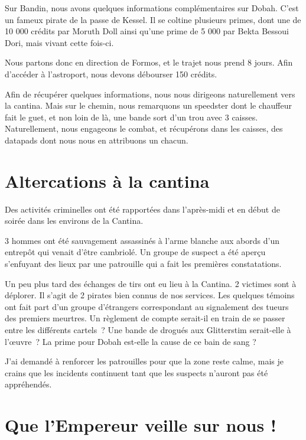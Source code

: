 \documentclass[a4paper,9pt,twoside,twocolumn,openany]{book}
\begin{document}
Sur Bandin, nous avons quelques informations complémentaires sur Dobah. C'est un fameux pirate de la passe de Kessel. Il se coltine plusieurs primes, dont une de 10 000 crédits par Moruth Doll ainsi qu'une prime de 5 000 par Bekta Bessoui Dori, mais vivant cette fois-ci.

Nous partons donc en direction de Formos, et le trajet nous prend 8 jours. Afin d’accéder à l'astroport, nous devons débourser 150 crédits.

Afin de récupérer quelques informations, nous nous dirigeons naturellement vers la cantina. Mais sur le chemin, nous remarquons un speedster dont le chauffeur fait le guet, et non loin de là, une bande sort d'un trou avec 3 caisses. Naturellement, nous engageons le combat, et récupérons dans les caisses, des datapads dont nous nous en attribuons un chacun.

\section{Altercations à la cantina}
\subtitle{Journal du Sergent Cody, Corps expéditionnaire de la planète Formos.  décembre 2014 }

Des activités criminelles ont été rapportées dans l’après-midi et en début de soirée dans les environs de la Cantina.

3 hommes ont été sauvagement assassinés à l’arme blanche aux abords d’un entrepôt qui venait d’être cambriolé. Un groupe de suspect a été aperçu s’enfuyant des lieux par une patrouille qui a fait les premières constatations.

Un peu plus tard des échanges de tirs ont eu lieu à la Cantina. 2 victimes sont à déplorer. Il s’agit de 2 pirates bien connus de nos services. Les quelques témoins ont fait part d'un groupe d'étrangers correspondant au signalement des tueurs des premiers meurtres.
Un règlement de compte serait-il en train de se passer entre les différents cartels\ ? Une bande de drogués aux Glitterstim serait-elle à l’œuvre\ ? La prime pour Dobah est-elle la cause de ce bain de sang ?

J’ai demandé à renforcer les patrouilles pour que la zone reste calme, mais je crains que les incidents continuent tant que les suspects n’auront pas été appréhendés.

\section{Que l’Empereur veille sur nous !}
\subtitle{14 décembre 2014}
\end{document}
